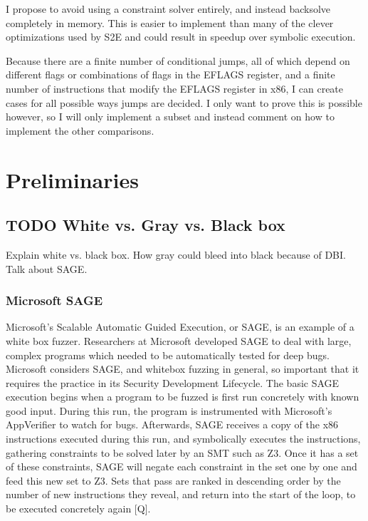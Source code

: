 \documentclass[11pt,expanded,copyright]{fsuthesis}
\begin{document}
I propose to avoid using a constraint solver entirely, and instead backsolve completely in memory. This is easier to implement than many of the clever optimizations used by S2E and could result in speedup over symbolic execution.

Because there are a finite number of conditional jumps, all of which depend on different flags or combinations of flags in the EFLAGS register, and a finite number of instructions that modify the EFLAGS register in x86, I can create cases for all possible ways jumps are decided. I only want to prove this is possible however, so I will only implement a subset and instead comment on how to implement the other comparisons.

\chapter{Preliminaries}

\section{TODO White vs. Gray vs. Black box}

Explain white vs. black box. How gray could bleed into black because of DBI. Talk about SAGE.

\subsection{Microsoft SAGE}

Microsoft's Scalable Automatic Guided Execution, or SAGE, is an example of a white box fuzzer. Researchers at Microsoft developed SAGE to deal with large, complex programs which needed to be automatically tested for deep bugs. Microsoft considers SAGE, and whitebox fuzzing in general, so important that it requires the practice in its Security Development Lifecycle. The basic SAGE execution begins when a program to be fuzzed is first run concretely with known good input. During this run, the program is instrumented with Microsoft's AppVerifier to watch for bugs. Afterwards, SAGE receives a copy of the x86 instructions executed during this run, and symbolically executes the instructions, gathering constraints to be solved later by an SMT such as Z3. Once it has a set of these constraints, SAGE will negate each constraint in the set one by one and feed this new set to Z3. Sets that pass are ranked in descending order by the number of new instructions they reveal, and return into the start of the loop, to be executed concretely again [Q].
\end{document}
